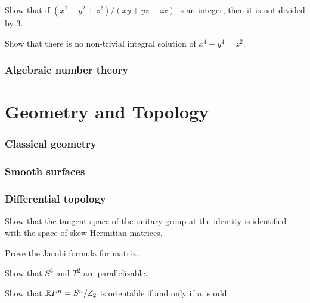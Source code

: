 \documentclass[12pt]{article}
\begin{document}
	\begin{prb}
	Show that if $(x^2+y^2+z^2)/(xy+yz+zx)$ is an integer, then it is not divided by 3.
	\end{prb}
	
	\begin{prb}
	Show that there is no non-trivial integral solution of $x^4-y^4=z^2$.
	\end{prb}

\section{Algebraic number theory}









\newpage
\part{Geometry and Topology}
\setcounter{section}{0}

\section{Classical geometry}

\section{Smooth surfaces}

\section{Differential topology}

	\begin{prb}
	Show that the tangent space of the unitary group at the identity is identified with the space of skew Hermitian matrices.
	\end{prb}

	\begin{prb}
	Prove the Jacobi formula for matrix.
	\end{prb}

	\begin{prb}
	Show that $S^3$ and $T^2$ are parallelizable.
	\end{prb}

	\begin{prb}
	Show that $\mathbb{R} P^n=S^n/Z_2$ is orientable if and only if $n$ is odd.
	\end{prb}
\end{document}
